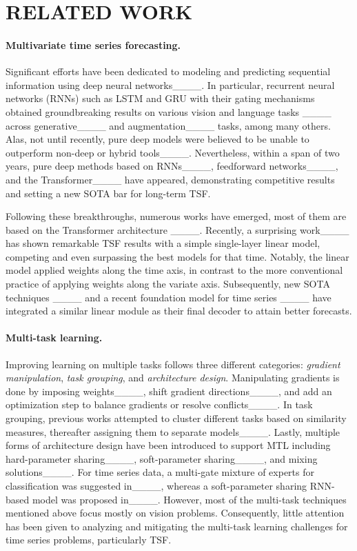 \section{RELATED WORK}
\label{sec:related}

\paragraph{Multivariate time series forecasting.} Significant efforts have been dedicated to modeling and predicting sequential information using deep neural networks____. In particular, recurrent neural networks (RNNs) such as LSTM and GRU with their gating mechanisms obtained groundbreaking results on various vision and language tasks ____ across generative____ and augmentation____ tasks, among many others. Alas, not until recently, pure deep models were believed to be unable to outperform non-deep or hybrid tools____. Nevertheless, within a span of two years, pure deep methods based on RNNs____, feedforward networks____, and the Transformer____ have appeared, demonstrating competitive results and setting a new SOTA bar for long-term TSF.

Following these breakthroughs, numerous works have emerged, most of them are based on the Transformer architecture ____. Recently, a surprising work____ has shown remarkable TSF results with a simple single-layer linear model, competing and even surpassing the best models for that time. Notably, the linear model applied weights along the time axis, in contrast to the more conventional practice of applying weights along the variate axis. Subsequently, new SOTA techniques ____ and a recent foundation model for time series ____ have integrated a similar linear module as their final decoder to attain better forecasts.


\paragraph{Multi-task learning.} Improving learning on multiple tasks follows three different categories: \emph{gradient manipulation}, \emph{task grouping}, and \emph{architecture design}. Manipulating gradients is done by imposing weights____, shift gradient directions____, and add an optimization step to balance gradients or resolve conflicts____. In task grouping, previous works attempted to cluster different tasks based on similarity measures, thereafter assigning them to separate models____. Lastly, multiple forms of architecture design have been introduced to support MTL including hard-parameter sharing____, soft-parameter sharing____, and mixing solutions____. For time series data, a multi-gate mixture of experts for classification was suggested in____, whereas a soft-parameter sharing RNN-based model was proposed in____. However, most of the  multi-task techniques mentioned above focus mostly on vision problems. Consequently, little attention has been given to analyzing and mitigating the multi-task learning challenges for time series problems, particularly TSF.
